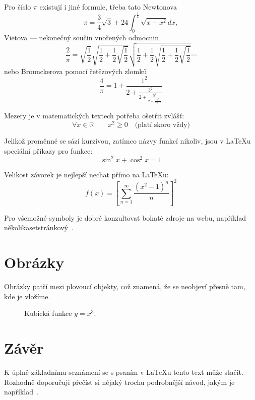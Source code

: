 \documentclass{article}
\begin{document}
	Pro číslo $\pi$ existují i jiné formule, třeba tato Newtonova
	\begin{equation}
		\pi=\frac{3}{4}\sqrt{3}+24\int_{0}^{\frac{1}{4}}\sqrt{x-x^2}dx,
	\end{equation}
	Vietova --- nekonečný součin vnořených odmocnin
	\begin{equation}
		\frac{2}{\pi}=\sqrt{\frac{1}{2}}\sqrt{\frac{1}{2}+\frac{1}{2}\sqrt{\frac{1}{2}}}\sqrt{\frac{1}{2}+\frac{1}{2}\sqrt{\frac{1}{2}+\frac{1}{2}\sqrt{\frac{1}{2}}}}\dotsb
	\end{equation}
	nebo Brounckerova pomocí řetězových zlomků
	\begin{equation}
		\label{eq:Brouncker}
		\frac{4}{\pi}=1+\frac{1^2}{2+\frac{3^2}{2+\frac{5^2}{2+\frac{7^2}{2+\dotsb}}}}
	\end{equation}
	
	Mezery je v matematických textech potřeba ošetřit zvlášť:
	\begin{equation}
		\forall x\in\mathbb{R}\qquad x^{2}\geq0 \quad\textrm{(platí skoro vždy)}
	\end{equation}
	
	Jelikož proměnné se sází kurzívou, zatímco názvy funkcí nikoliv,
	jsou v \LaTeX u speciální příkazy pro funkce:
	\begin{equation}
		\sin^{2}x+\cos^2{x}=1
	\end{equation}
	
	Velikost závorek je nejlepší nechat přímo na \LaTeX u:
	\begin{equation}
		f(x)=\left[\sum_{n=1}^{\infty}\frac{\left(x^2-1\right)^n}{n}\right]^2
	\end{equation}
	
	Pro všemožné symboly je dobré konzultovat bohaté zdroje na webu,
	například několikasetstránkový~\cite{ref:SymbolList}. 
	
	\section{Obrázky}
	Obrázky patří mezi plovoucí objekty, což znamená, že se neobjeví přesně tam, kde je vložíme.
		\begin{figure}[!htbp]
			\centering
			\caption{Kubická funkce $y=x^3$.}
			\label{fig:bandf}
		\end{figure}	

	\section{Závěr}
		K úplně základnímu seznámení se s psaním v \LaTeX u tento text může stačit.
		Rozhodně doporučuji přečíst si nějaký trochu podrobnější návod, jakým je například~\cite{ref:UvodLaTeX}.
\end{document}
